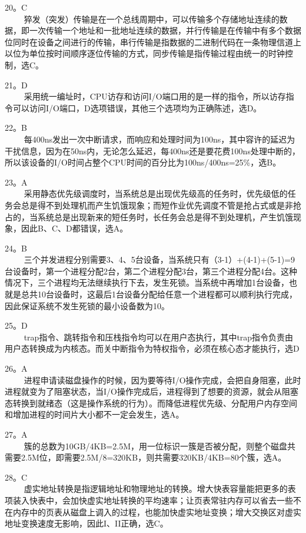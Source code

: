 20。C \\
$\qquad$ 猝发（突发）传输是在一个总线周期中，可以传输多个存储地址连续的数据，即一次传输一个地址和一批地址连续的数据，并行传输是在传输中有多个数据位同时在设备之间进行的传输，串行传输是指数据的二进制代码在一条物理信道上以位为单位按时间顺序逐位传输的方式，同步传输是指传输过程由统一的时钟控制，选C。

21。D \\
$\qquad$ 采用统一编址时，CPU访存和访问I/O端口用的是一样的指令，所以访存指令可以访问I/O端口，D选项错误，其他三个选项均为正确陈述，选D。

22。B \\
$\qquad$ 每400ns发出一次中断请求，而响应和处理时间为100ns，其中容许的延迟为干扰信息，因为在50ns内，无论怎么延迟，每400ns还是要花费100ns处理中断的，所以该设备的I/O时间占整个CPU时间的百分比为100ns/400ns=25\%，选B。

23。A \\
$\qquad$ 采用静态优先级调度时，当系统总是出现优先级高的任务时，优先级低的任务会总是得不到处理机而产生饥饿现象；而短作业优先调度不管是抢占式或是非抢占的，当系统总是出现新来的短任务时，长任务会总是得不到处理机，产生饥饿现象，因此B、C、D都错误，选A。

24。B \\
$\qquad$ 三个并发进程分别需要3、4、5台设备，当系统只有（3-1）+(4-1)+(5-1)=9台设备时，第一个进程分配2台，第二个进程分配3台，第三个进程分配4台。这种情况下，三个进程均无法继续执行下去，发生死锁。当系统中再增加1台设备，也就是总共10台设备时，这最后1台设备分配给任意一个进程都可以顺利执行完成，因此保证系统不发生死锁的最小设备数为10。

25。D \\
$\qquad$ trap指令、跳转指令和压栈指令均可以在用户态执行，其中trap指令负责由用户态转换成为内核态。而关中断指令为特权指令，必须在核心态才能执行，选D

26。A \\
$\qquad$ 进程申请读磁盘操作的时候，因为要等待I/O操作完成，会把自身阻塞，此时进程就变为了阻塞状态，当I/O操作完成后，进程得到了想要的资源，就会从阻塞态转换到就绪态（这是操作系统的行为）。而降低进程优先级、分配用户内存空间和增加进程的时间片大小都不一定会发生，选A。

27。A \\
$\qquad$ 簇的总数为10GB/4KB=2.5M，用一位标识一簇是否被分配，则整个磁盘共需要2.5M位，即需要2.5M/8=320KB，则共需要320KB/4KB=80个簇，选A。

28。C \\
$\qquad$ 虚实地址转换是指逻辑地址和物理地址的转换。增大快表容量能把更多的表项装入快表中，会加快虚实地址转换的平均速率；让页表常驻内存可以省去一些不在内存中的页表从磁盘上调入的过程，也能加快虚实地址变换；增大交换区对虚实地址变换速度无影响，因此I、II正确，选C。

